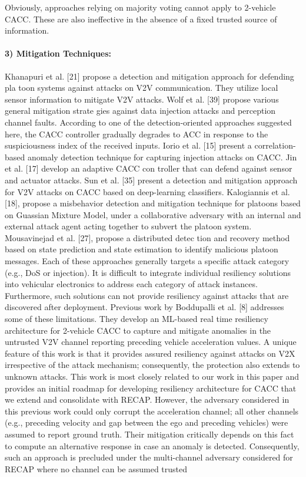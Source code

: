 \documentclass[letterpaper, 10pt, conference]{ieeeconf}  %
\begin{document}
 Obviously, approaches relying on majority voting cannot
 apply to 2-vehicle CACC. These are also ineffective in the
 absence of a fixed trusted source of information.
 \paragraph*{ 3) Mitigation Techniques:} Khanapuri et al. [21] propose
 a detection and mitigation approach for defending pla
toon systems against attacks on V2V communication. They
 utilize local sensor information to mitigate V2V attacks.
 Wolf et al. [39] propose various general mitigation strate
gies against data injection attacks and perception channel
 faults. According to one of the detection-oriented approaches
 suggested here, the CACC controller gradually degrades
 to ACC in response to the suspiciousness index of the
 received inputs. Iorio et al. [15] present a correlation-based
 anomaly detection technique for capturing injection attacks
 on CACC. Jin et al. [17] develop an adaptive CACC con
troller that can defend against sensor and actuator attacks.
 Sun et al. [35] present a detection and mitigation approach
 for V2V attacks on CACC based on deep-learning classifiers.
 Kalogiannis et al. [18], propose a misbehavior detection and
 mitigation technique for platoons based on Guassian Mixture
 Model, under a collaborative adversary with an internal and
 external attack agent acting together to subvert the platoon
 system. Mousavinejad et al. [27], propose a distributed detec
tion and recovery method based on state prediction and state
 estimation to identify malicious platoon messages. Each of
 these approaches generally targets a specific attack category
 (e.g., DoS or injection). It is difficult to integrate individual
 resiliency solutions into vehicular electronics to address each
 category of attack instances. Furthermore, such solutions can
not provide resiliency against attacks that are discovered after
 deployment. Previous work by Boddupalli et al. [8] addresses
 some of these limitations. They develop an ML-based real
time resiliency architecture for 2-vehicle CACC to capture
 and mitigate anomalies in the untrusted V2V channel reporting
 preceding vehicle acceleration values. A unique feature of this
 work is that it provides assured resiliency against attacks on
 V2X irrespective of the attack mechanism; consequently, the
 protection also extends to unknown attacks. This work is most
 closely related to our work in this paper and provides an initial
 roadmap for developing resiliency architecture for CACC
 that we extend and consolidate with RECAP. However, the
 adversary considered in this previous work could only corrupt
 the acceleration channel; all other channels (e.g., preceding
 velocity and gap between the ego and preceding vehicles) were
 assumed to report ground truth. Their mitigation critically
 depends on this fact to compute an alternative response in
 case an anomaly is detected. Consequently, such an approach
 is precluded under the multi-channel adversary considered for
 RECAP where no channel can be assumed trusted
\end{document}
